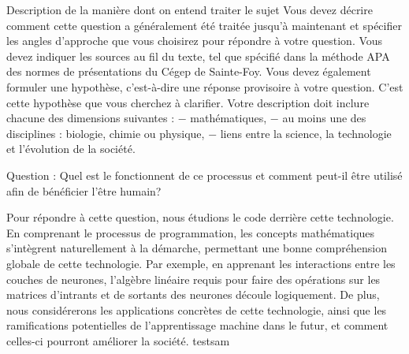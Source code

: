 Description de la manière dont on entend traiter le sujet
Vous devez décrire comment cette question a généralement été traitée jusqu’à maintenant et spécifier les
angles d’approche que vous choisirez pour répondre à votre question. Vous devez indiquer les sources au
fil du texte, tel que spécifié dans la méthode APA des normes de présentations du Cégep de Sainte-Foy.
Vous devez également formuler une hypothèse, c’est-à-dire une réponse provisoire à votre question. C’est
cette hypothèse que vous cherchez à clarifier.
Votre description doit inclure chacune des dimensions suivantes :
− mathématiques,
− au moins une des disciplines : biologie, chimie ou physique,
− liens entre la science, la technologie et l’évolution de la société.

Question : Quel est le fonctionnent de ce processus et comment peut-il être utilisé afin de bénéficier l’être humain?

Pour répondre à cette question, nous étudions le code derrière cette technologie. 
En comprenant le processus de programmation, les concepts mathématiques s'intègrent naturellement à
la démarche, permettant une bonne compréhension globale de cette technologie. Par exemple, en apprenant les interactions
entre les couches de neurones, l'algèbre linéaire requis pour faire des opérations sur les matrices d'intrants et de sortants
des neurones découle logiquement. De plus, nous considérerons les applications concrètes de cette technologie, ainsi que les
ramifications potentielles de l'apprentissage machine dans le futur, et comment celles-ci pourront améliorer la société.
testsam
